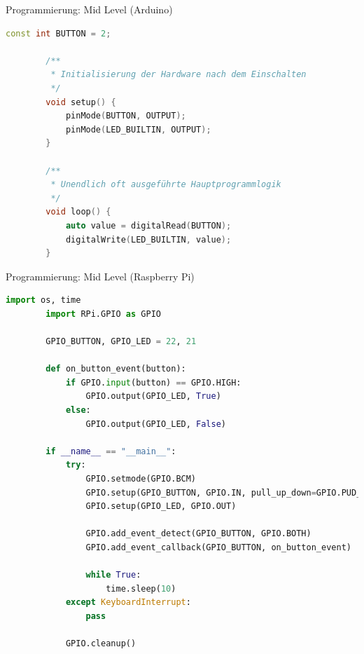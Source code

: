 \begin{frame}[fragile]{Programmierung: Mid Level (Arduino)}

    \smallskip

    \begin{lstlisting}[language=C++, gobble=8, basicstyle=\tiny\ttfamily]
        const int BUTTON = 2;

        /**
         * Initialisierung der Hardware nach dem Einschalten
         */
        void setup() {
            pinMode(BUTTON, OUTPUT);
            pinMode(LED_BUILTIN, OUTPUT);
        }

        /**
         * Unendlich oft ausgeführte Hauptprogrammlogik
         */
        void loop() {
            auto value = digitalRead(BUTTON);
            digitalWrite(LED_BUILTIN, value);
        }
    \end{lstlisting}
\end{frame}

\begin{frame}[fragile]{Programmierung: Mid Level (Raspberry Pi)}

    \smallskip

    \begin{lstlisting}[language=Python, gobble=8, basicstyle=\tiny\ttfamily]
        import os, time
        import RPi.GPIO as GPIO

        GPIO_BUTTON, GPIO_LED = 22, 21

        def on_button_event(button):
            if GPIO.input(button) == GPIO.HIGH:
                GPIO.output(GPIO_LED, True)
            else:
                GPIO.output(GPIO_LED, False)

        if __name__ == "__main__":
            try:
                GPIO.setmode(GPIO.BCM)
                GPIO.setup(GPIO_BUTTON, GPIO.IN, pull_up_down=GPIO.PUD_UP)
                GPIO.setup(GPIO_LED, GPIO.OUT)

                GPIO.add_event_detect(GPIO_BUTTON, GPIO.BOTH)
                GPIO.add_event_callback(GPIO_BUTTON, on_button_event)

                while True:
                    time.sleep(10)
            except KeyboardInterrupt:
                pass

            GPIO.cleanup()
    \end{lstlisting}
\end{frame}

